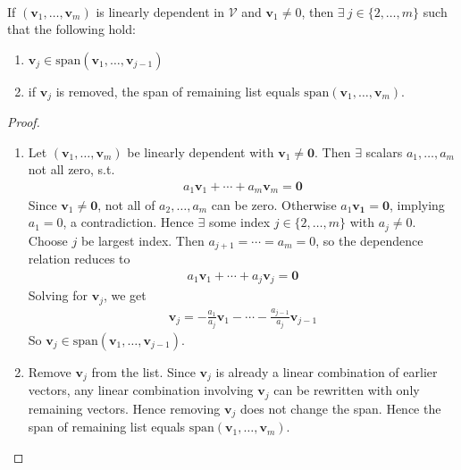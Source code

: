 \begin{lemma} \label{lem:lineardependencelemma} \\
If $(\mathbf{v}_1, \ldots, \mathbf{v}_m)$ is linearly dependent in $\mathcal{V}$ and $\mathbf{v}_1 \neq 0$, then $\exists \ j \in \{2, \ldots, m \}$ such that the following hold:
\begin{enumerate}[label=\roman*.]
\setlength{\itemsep}{0pt}
\item $\mathbf{v}_j \in \text{span}(\mathbf{v}_1, \ldots, \mathbf{v}_{j-1})$
\item if $\mathbf{v}_j$ is removed, the span of remaining list equals $\text{span}(\mathbf{v}_1, \ldots, \mathbf{v}_m)$.
\end{enumerate}
\begin{proof}
\begin{enumerate}[label=\roman*.]
\setlength{\itemsep}{0pt}
\item Let $(\mathbf{v}_1, \ldots, \mathbf{v}_m)$ be linearly dependent with $\mathbf{v}_1 \neq \mathbf{0}$. Then $\exists$ scalars $a_1, \ldots, a_m$ not all zero, s.t. 
\begin{align}
a_1 \mathbf{v}_1 + \cdots + a_m \mathbf{v}_m = \mathbf{0} \nonumber
\end{align}
Since $\mathbf{v}_1 \neq \mathbf{0}$, not all of $a_2, \ldots, a_m$ can be zero. Otherwise $a_1 \mathbf{v_1} = \mathbf{0}$, implying $a_1 = 0$, a contradiction. Hence $\exists$ some index $j \in \{ 2, \ldots, m \}$ with $a_j \neq 0$.\\
Choose $j$ be largest index. Then $a_{j+1} = \cdots = a_m = 0$, so the dependence relation reduces to
\begin{align}
a_1 \mathbf{v}_1 + \cdots + a_j \mathbf{v}_j = \mathbf{0} \nonumber
\end{align}
Solving for $\mathbf{v}_j$, we get
\begin{align}
\mathbf{v}_j = - \frac{a_1}{a_j}\mathbf{v}_1 - \cdots - \frac{a_{j-1}}{a_j} \mathbf{v}_{j-1} \nonumber
\end{align}
So $\mathbf{v}_j \in \text{span}(\mathbf{v}_1, \ldots, \mathbf{v}_{j-1})$.
\item Remove $\mathbf{v}_j$ from the list. Since $\mathbf{v}_j$ is already a linear combination of earlier vectors, any linear combination involving $\mathbf{v}_j$ can be rewritten with only remaining vectors. Hence removing $\mathbf{v}_j$ does not change the span. Hence the span of remaining list equals $\text{span}(\mathbf{v}_1, \ldots, \mathbf{v}_m)$.
\end{enumerate}
\end{proof}
\end{lemma}

